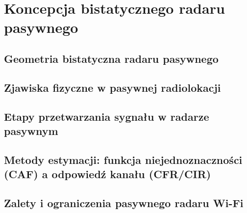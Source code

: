 \section{Koncepcja bistatycznego radaru pasywnego}
\label{sec:pbr}


\subsection{Geometria bistatyczna radaru pasywnego}
\label{subsec:pbr_geometry}

\subsection{Zjawiska fizyczne w pasywnej radiolokacji}
\label{subsec:pbr_physics}

\subsection{Etapy przetwarzania sygnału w radarze pasywnym}
\label{subsec:pbr_processing_stages}

\subsection{Metody estymacji: funkcja niejednoznaczności (CAF) a odpowiedź kanału (CFR/CIR)}
\label{subsec:pbr_caf_vs_cir}

\subsection{Zalety i ograniczenia pasywnego radaru Wi-Fi}
\label{subsec:pbr_pros_cons}
